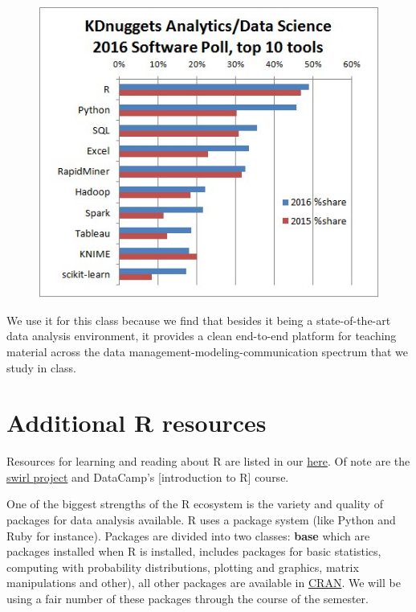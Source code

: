 \documentclass[12pt,]{book}
\theoremstyle{definition}
\theoremstyle{definition}
\theoremstyle{remark}
\begin{document}
\begin{figure}
\centering
\includegraphics{img/kdnuggets-2016.jpg}
\caption{}
\end{figure}

We use it for this class because we find that besides it being a
state-of-the-art data analysis environment, it provides a clean
end-to-end platform for teaching material across the data
management-modeling-communication spectrum that we study in class.

\section{Additional R resources}\label{additional-r-resources}

Resources for learning and reading about R are listed in our
\href{http://www.hcbravo.org/IntroDataScience/resources/}{here}. Of note
are the \href{http://swirlstats.com/}{swirl project} and DataCamp's
{[}introduction to R{]} course.

One of the biggest strengths of the R ecosystem is the variety and
quality of packages for data analysis available. R uses a package system
(like Python and Ruby for instance). Packages are divided into two
classes: \textbf{base} which are packages installed when R is installed,
includes packages for basic statistics, computing with probability
distributions, plotting and graphics, matrix manipulations and other),
all other packages are available in
\href{http://cran.r-project.org}{CRAN}. We will be using a fair number
of these packages through the course of the semester.
\end{document}
